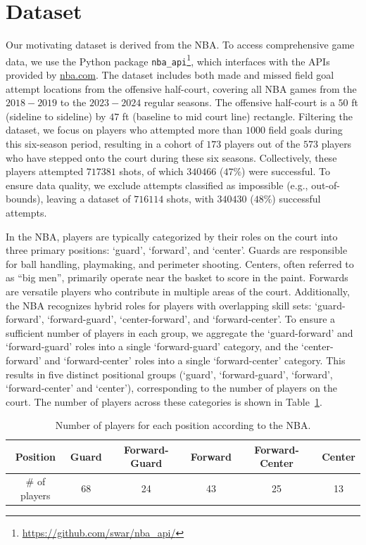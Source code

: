 \section{Dataset} %
\label{sec:dataset}

Our motivating dataset is derived from the NBA. To access comprehensive game data, we use the Python package \texttt{nba\_api}\footnote{\url{https://github.com/swar/nba_api/}}, which interfaces with the APIs provided by \url{nba.com}. The dataset includes both made and missed field goal attempt locations from the offensive half-court, covering all NBA games from the $2018-2019$ to the $2023-2024$ regular seasons. The offensive half-court is a $50$ ft (sideline to sideline) by $47$ ft (baseline to mid court line) rectangle. Filtering the dataset, we focus on players who attempted more than $1000$ field goals during this six-season period, resulting in a cohort of $173$ players out of the $573$ players who have stepped onto the court during these six seasons. Collectively, these players attempted $717381$ shots, of which $340466$ ($47\%$) were successful. To ensure data quality, we exclude attempts classified as impossible (e.g., out-of-bounds), leaving a dataset of $716114$ shots, with $340430$ ($48\%$) successful attempts.


In the NBA, players are typically categorized by their roles on the court into three primary positions: `guard', `forward', and `center'. Guards are responsible for ball handling, playmaking, and perimeter shooting. Centers, often referred to as ``big men'', primarily operate near the basket to score in the paint. Forwards are versatile players who contribute in multiple areas of the court. Additionally, the NBA recognizes hybrid roles for players with overlapping skill sets: `guard-forward', `forward-guard', `center-forward', and `forward-center'. To ensure a sufficient number of players in each group, we aggregate the `guard-forward' and `forward-guard' roles into a single `forward-guard' category, and the `center-forward' and `forward-center' roles into a single `forward-center' category. This results in five distinct positional groups (`guard', `forward-guard', `forward', `forward-center' and `center'), corresponding to the number of players on the court. The number of players across these categories is shown in Table~\ref{tab:player_position}.
\begin{table}
	\centering
	\caption{Number of players for each position according to the NBA.}
	\label{tab:player_position}
	\begin{tabular}{ c|ccccc }
		Position      & Guard & Forward-Guard & Forward & Forward-Center & Center \\
		\hline
		\# of players & 68    & 24            & 43      & 25             & 13     \\
	\end{tabular}
\end{table}


